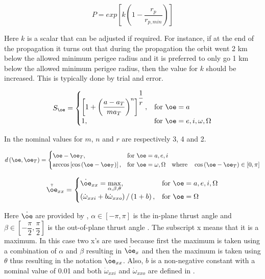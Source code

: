 \begin{equation} \label{eq:P}
P=exp\left[k\left(1-\dfrac{r_{p}}{r_{p,min}}\right)\right]
\end{equation}

Here $k$ is a scalar that can be adjusted if required. For instance, if at the end of the propagation it turns out that during the propagation the orbit went 2 km below the allowed minimum perigee radius and it is preferred to only go 1 km below the allowed minimum perigee radius, then the value for $k$ should be increased. This is typically done by trial and error.


\begin{equation}\label{eq:S}
S_{\oe}=\begin{cases}
\left[1+\left(\dfrac{a-a_{T}}{ma_{T}}\right)^{n}\right]^{\dfrac{1}{r}}, & \text{for } \oe=a\\
1, & \text{for } \oe=e,i,\omega,\Omega
\end{cases}
\end{equation}

In  the nominal values for $m$, $n$ and $r$ are respectively 3, 4 and 2. 


\begin{equation}\label{eq:doeoet}
d\left(\oe,\oe_{T}\right)=\begin{cases}
\oe-\oe_{T}, & \text{for } \oe =a,e,i\\
\arccos\left[\cos\left(\oe-\oe_{T}\right)\right], & \text{for } \oe=\omega,\Omega \quad \text{where} \quad \cos\left(\oe-\oe_{T}\right)\in \left[0,\pi\right]
\end{cases}
\end{equation}


\begin{equation}\label{eq:crazy_oe}
\tilde{\dot{\oe}}_{xx}=\begin{cases}
\dot{\oe}_{xx}=\displaystyle\max_{\alpha,\beta,\theta}, & \text{for } \oe =a,e,i,\Omega\\
\left(\dot{\omega}_{xxi}+b\dot{\omega}_{xxo}\right)/\left(1+b\right), & \text{for } \oe=\Omega
\end{cases}
\end{equation}

Here $\dot{\oe}$ are provided by , $\alpha \in [-\pi,\pi]$ is the in-plane thrust angle and $\beta \in [-\dfrac{\pi}{2},\dfrac{\pi}{2}]$ is the out-of-plane thrust angle \cite{gebbett2014multi}. The subscript x means that it is a maximum. In this case two x's are used because first the maximum is taken using a combination of $\alpha$ and $\beta$ resulting in $\dot{\oe}_{x}$ and then the maximum is taken using $\theta$ thus resulting in the notation $\dot{\oe}_{xx}$. Also, $b$ is a non-negative constant with a nominal value of 0.01 and both $\dot{\omega}_{xxi}$ and $\dot{\omega}_{xxo}$ are defined in .

